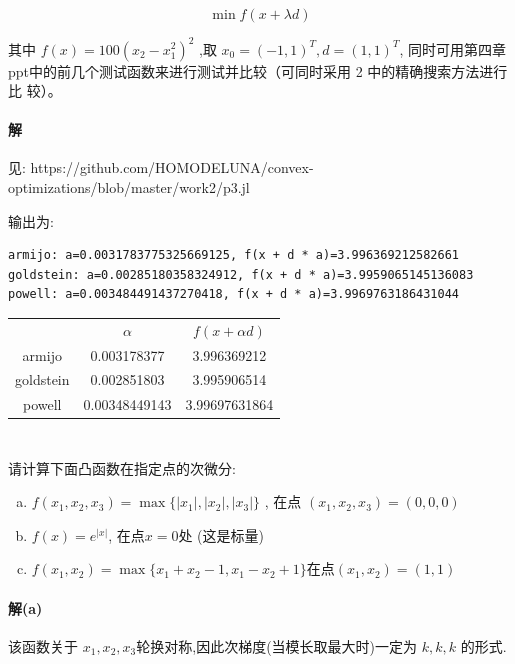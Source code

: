 \documentclass[a4paper]{article}
\begin{document}
\[ \min f(x + \lambda d)\]

其中 \(f(x)=100(x_2 - x_1^2)^2 \) ,取 \(x_0 = (-1,1)^T, d = (1,1)^T\), 同时可用第四章
ppt中的前几个测试函数来进行测试并比较（可同时采用 2 中的精确搜索方法进行比
较）。

\paragraph{解}

见: https://github.com/HOMODELUNA/convex-optimizations/blob/master/work2/p3.jl

输出为:
\begin{lstlisting}
armijo: a=0.0031783775325669125, f(x + d * a)=3.996369212582661
goldstein: a=0.00285180358324912, f(x + d * a)=3.9959065145136083
powell: a=0.003484491437270418, f(x + d * a)=3.9969763186431044
\end{lstlisting}

\begin{table}[H]
    \centering
    \begin{tabular}{ccc}
                &$\alpha$ & $f(x + \alpha d)$ \\
         armijo & 0.003178377 & 3.996369212 \\
         goldstein & 0.002851803 & 3.995906514 \\
         powell & 0.00348449143 & 3.99697631864
    \end{tabular}
\end{table}

\section{}

请计算下面凸函数在指定点的次微分:
\begin{enumerate}[(a)]
    \item \(f(x_1,x_2,x_3) = \max\{|x_1|,|x_2|,|x_3|\}\) , 在点 \((x_1,x_2,x_3) = (0,0,0)\)
    \item \(f(x) = e^{|x|}\), 在点\(x=0\)处 (这是标量)
    \item \(f(x_1,x_2) = \max\{x_1+x_2-1,x_1-x_2+1\}\)在点\((x_1,x_2) = (1,1)\) 
\end{enumerate}

\paragraph{解(a)}
该函数关于 \(x_1,x_2,x_3\)轮换对称,因此次梯度(当模长取最大时)一定为 \(k,k,k\) 的形式.
\end{document}
